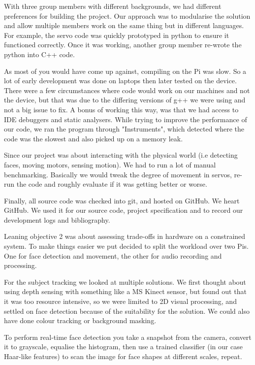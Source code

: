 \documentclass[11pt,a4paper,titlepage]{report}
\begin{document}
\begin{appendices}
With three group members with different backgrounds, we had different preferences for building the project. Our approach was to modularise the solution and allow multiple members work on the same thing but in different languages. For example, the servo code was quickly prototyped in python to ensure it functioned correctly. Once it was working, another group member re-wrote the python into C++ code. 

As most of you would have come up against, compiling on the Pi was slow. So a lot of early development was done on laptops then later tested on the device. There were a few circumstances where code would work on our machines and not the device, but that was due to the differing versions of g++ we were using and not a big issue to fix. A bonus of working this way, was that we had access to IDE debuggers and static analysers. While trying to improve the performance of our code, we ran the program through "Instruments", which detected where the code was the slowest and also picked up on a memory leak. 

Since our project was about interacting with the physical world (i.e detecting faces, moving motors, sensing motion). We had to run a lot of manual benchmarking. Basically we would tweak the degree of movement in servos, re-run the code and roughly evaluate if it was getting better or worse.

Finally, all source code was checked into git, and hosted on GitHub. We heart GitHub. We used it for our source code, project specification and to record our development logs and bibliography.

Leaning objective 2 was about assessing trade-offs in hardware on a constrained system. To make things easier we put decided to split the workload over two Pis. One for face detection and movement, the other for audio recording and processing. 

For the subject tracking we looked at multiple solutions. We first thought about using depth sensing with something like a MS Kinect sensor, but found out that it was too resource intensive, so we were limited to 2D visual processing, and settled on face detection because of the suitability for the solution. We could also have done colour tracking or background masking.

To perform real-time face detection you take a snapshot from the camera, convert it to grayscale, equalise the histogram, then use a trained classifier (in our case Haar-like features) to scan the image for face shapes at different scales, repeat.


\end{appendices}
\end{document}
